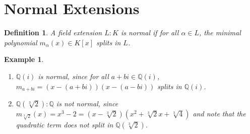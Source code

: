 \documentclass[11pt]{book}
\newtheorem{definition}[theorem]{Definition}
\newtheorem{example}[theorem]{Example}
\begin{document}
\section{Normal Extensions}
\begin{definition}
    A field extension \( L: K \) is normal if for all \( \alpha \in L \), the minimal polynomial \( m_{\alpha}(x)  \in K[x] \)  splits in \( L \).
\end{definition}

\begin{example} \label{eg-normal}
    \begin{enumerate}
        \item $\mathbb{Q}(i)$ is normal, since for all $a+bi \in \mathbb{Q}(i)$,  $m_{a+bi}=(x-(a+bi))(x-(a-bi))$ splits in $\mathbb{Q}(i)$.
        \item $\mathbb{Q}(\sqrt[3]{2}) :\mathbb{Q} $ is not normal, since 
        $m_{\sqrt[3]{2}}(x)=x^3-2=(x-\sqrt[3]{2})(x^2+\sqrt[3]{2}x+\sqrt[3]{4})$
        and note that the quadratic term does not split in $\mathbb{Q}(\sqrt[3]{2})$.
    \end{enumerate}
    
\end{example}
\end{document}
